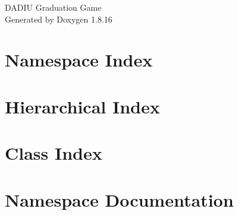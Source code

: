 \let\mypdfximage\pdfximage\def\pdfximage{\immediate\mypdfximage}\documentclass[twoside]{book}
\newcommand{\+}{\discretionary{\mbox{\scriptsize$\hookleftarrow$}}{}{}}
\newcommand{\clearemptydoublepage}{%
  \newpage{\pagestyle{empty}\cleardoublepage}%
}
\begin{document}
\hypersetup{pageanchor=false,
             bookmarksnumbered=true,
             pdfencoding=unicode
            }
\begin{titlepage}
\vspace*{7cm}
\begin{center}%
{\Large D\+A\+D\+IU Graduation Game }\\
\vspace*{1cm}
{\large Generated by Doxygen 1.8.16}\\
\end{center}
\end{titlepage}
\clearemptydoublepage
{}
\tableofcontents
\clearemptydoublepage
{}
\hypersetup{pageanchor=true}

\chapter{Namespace Index}

\chapter{Hierarchical Index}

\chapter{Class Index}

\chapter{Namespace Documentation}










\end{document}
